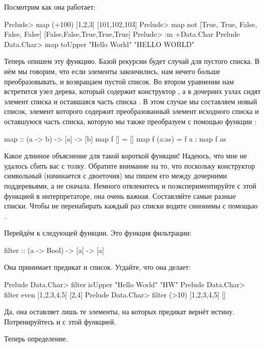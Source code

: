 Посмотрим как она работает:

\begin{code}
Prelude> map (+100) [1,2,3]
[101,102,103]
Prelude> map not [True, True, False, False, False]
[False,False,True,True,True]
Prelude> :m +Data.Char
Prelude Data.Char> map toUpper "Hello World"
"HELLO WORLD"
\end{code}

Теперь опишем эту функцию.
Базой рекурсии будет случай для пустого списка.
В нём мы говорим, что если элементы закончились, нам нечего
больше преобразовывать, и возвращаем пустой список. 
Во втором уравнении нам встретится узел дерева,
который содержит конструктор \In{:}, а в дочерних узлах
сидят элемент списка  и оставшаяся часть списка . 
 В этом случае 
мы составляем новый список, элемент которого содержит
преобразованный элемент  исходного списка
и оставшуюся часть списка, которую мы также
преобразуем с помощью функции :

\begin{code}
map :: (a -> b) -> [a] -> [b]
map f []     = []
map f (a:as) = f a : map f as
\end{code}

Какое длинное объяснение для такой короткой функции! Надеюсь, что
мне не удалось сбить вас с толку. Обратите внимание на то, 
что поскольку конструктор символьный (начинается с двоеточия) 
мы пишем его между дочерними поддеревьями, а не сначала.
Немного отвлекитесь
и поэкспериментируйте с этой функцией в интерпретаторе,
она очень важная. Составляйте самые разные списки.
Чтобы не перенабирать каждый раз списки водите
синонимы с помощью .

Перейдём к следующей функции. Это функция фильтрации:

\begin{code}
filter :: (a -> Bool) -> [a] -> [a]
\end{code}

Она принимает предикат и список. Угдайте, что она делает:

\begin{code}
Prelude Data.Char> filter isUpper "Hello World"
"HW"
Prelude Data.Char> filter even [1,2,3,4,5]
[2,4]
Prelude Data.Char> filter (>10) [1,2,3,4,5]
[]
\end{code}

Да, она оставляет лишь те элементы, на которых
предикат вернёт истину. Потренируйтесь и с этой функцией.

Теперь определение.

